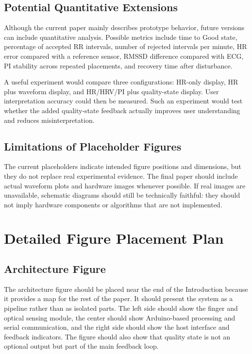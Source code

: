 \documentclass[10pt,conference]{IEEEtran}
\begin{document}
\subsection{Potential Quantitative Extensions}
Although the current paper mainly describes prototype behavior, future versions can include quantitative analysis. Possible metrics include time to Good state, percentage of accepted RR intervals, number of rejected intervals per minute, HR error compared with a reference sensor, RMSSD difference compared with ECG, PI stability across repeated placements, and recovery time after disturbance.

A useful experiment would compare three configurations: HR-only display, HR plus waveform display, and HR/HRV/PI plus quality-state display. User interpretation accuracy could then be measured. Such an experiment would test whether the added quality-state feedback actually improves user understanding and reduces misinterpretation.

\subsection{Limitations of Placeholder Figures}
The current placeholders indicate intended figure positions and dimensions, but they do not replace real experimental evidence. The final paper should include actual waveform plots and hardware images whenever possible. If real images are unavailable, schematic diagrams should still be technically faithful: they should not imply hardware components or algorithms that are not implemented.

\section{Detailed Figure Placement Plan}
\subsection{Architecture Figure}
The architecture figure should be placed near the end of the Introduction because it provides a map for the rest of the paper. It should present the system as a pipeline rather than as isolated parts. The left side should show the finger and optical sensing module, the center should show Arduino-based processing and serial communication, and the right side should show the host interface and feedback indicators. The figure should also show that quality state is not an optional output but part of the main feedback loop.
\end{document}
